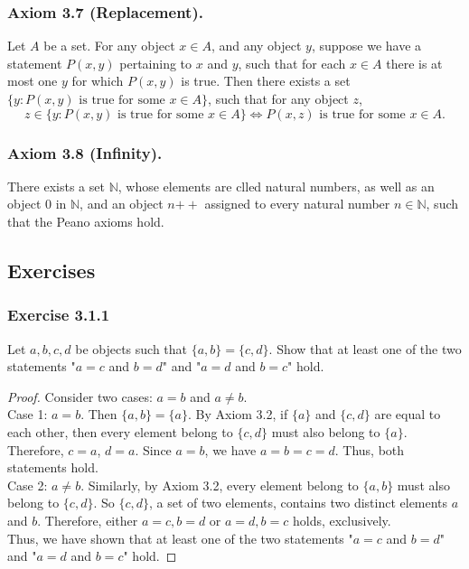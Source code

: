 \documentclass[12pt, letter]{article}
\begin{document}
\subsubsection*{Axiom 3.7 (Replacement).}
Let $A$ be a set. For any object $x\in A$, and any object $y$, suppose we have a statement $P(x,y)$ pertaining to $x$ and $y$, such that for each $x\in A$ there is at most one $y$
for which $P(x,y)$ is true. Then there exists a set $\{y:P(x,y)\text{ is true for some }x\in A\}$, such that for any object $z$,
\begin{equation*}
    z\in\{y:P(x,y)\text{ is true for some }x\in A\}\iff P(x,z) \text{ is true for some }x\in A. 
\end{equation*}
\subsubsection*{Axiom 3.8 (Infinity).}
There exists a set $\mathbb{N}$, whose elements are clled natural numbers, as well as an object 0 in $\mathbb{N}$, and an object $n\mathtt{++}$ assigned to every natural number $n\in\mathbb{N}$, 
such that the Peano axioms hold.



\subsection*{Exercises}
\subsubsection*{Exercise 3.1.1}
Let $a,b,c,d$ be objects such that $\{a,b\}=\{c,d\}$. Show that at least one of the two statements "$a=c$ and $b=d$" and "$a=d$ and $b=c$" hold.
\begin{proof}
    Consider two cases: $a=b$ and $a\ne b$.\\
    Case 1: $a=b$. Then $\{a,b\}=\{a\}$. By Axiom 3.2, if $\{a\}$ and $\{c,d\}$ are equal to each other, then every element belong to $\{c,d\}$ must also belong to $\{a\}$. 
    Therefore, $c=a$, $d=a$. Since $a=b$, we have $a=b=c=d$. Thus, both statements hold.\\
    Case 2: $a\ne b$. Similarly, by Axiom 3.2, every element belong to $\{a,b\}$ must also belong to $\{c,d\}$. So $\{c,d\}$, a set of two elements, contains two distinct elements $a$ and $b$. Therefore, 
    either $a=c, b=d$ or $a=d, b=c$ holds, exclusively.\\
    Thus, we have shown that at least one of the two statements "$a=c$ and $b=d$" and "$a=d$ and $b=c$" hold.
\end{proof}
\end{document}
